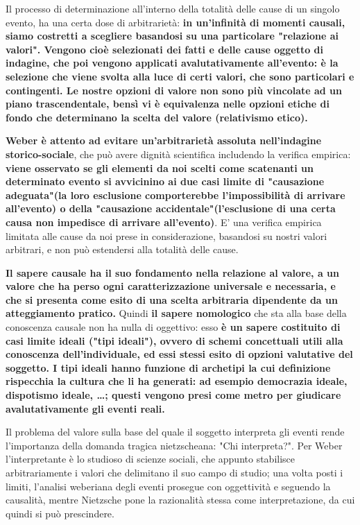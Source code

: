 Il processo di determinazione all'interno della totalità delle cause di un singolo evento, ha una certa dose di arbitrarietà: \textbf{in un'infinità di momenti causali, siamo costretti a scegliere basandosi su una particolare "relazione ai valori". Vengono cioè selezionati dei fatti e delle cause oggetto di indagine, che poi vengono applicati avalutativamente all'evento: è la selezione che viene svolta alla luce di certi valori, che sono particolari e contingenti. Le nostre opzioni di valore non sono più vincolate  ad un piano trascendentale, bensì vi è equivalenza nelle opzioni etiche di fondo che determinano la scelta del valore (relativismo etico).}

\textbf{Weber è attento ad evitare un'arbitrarietà assoluta nell'indagine storico-sociale}, che può avere dignità scientifica includendo la verifica empirica: \textbf{viene osservato se gli elementi da noi scelti come scatenanti un determinato evento si avvicinino ai due casi limite di "causazione adeguata"(la loro esclusione comporterebbe l'impossibilità di arrivare all'evento) o della "causazione accidentale"(l'esclusione di una certa causa non impedisce di arrivare all'evento)}. E' una verifica empirica limitata  alle cause da noi prese in considerazione, basandosi su nostri valori arbitrari, e non può estendersi alla totalità delle cause.

\textbf{Il sapere causale ha il suo fondamento nella relazione al valore, a un valore che ha perso ogni caratterizzazione universale e necessaria, e che si presenta come esito di una scelta arbitraria dipendente  da  un atteggiamento pratico.}
Quindi \textbf{il sapere nomologico} che sta alla base della conoscenza causale non ha nulla di oggettivo: esso \textbf{è un sapere costituito  di casi limite ideali ("tipi ideali"), ovvero di schemi concettuali utili alla conoscenza dell'individuale, ed essi stessi esito di  opzioni valutative del soggetto. I tipi ideali hanno funzione di archetipi la cui definizione rispecchia la cultura che li ha generati: ad esempio democrazia ideale, dispotismo ideale, \dots; questi vengono presi come metro per giudicare avalutativamente gli eventi reali.}
 
Il problema del valore sulla base del quale il soggetto interpreta gli eventi rende l'importanza della domanda tragica nietzscheana: "Chi interpreta?". Per Weber l'interpretante è lo studioso di scienze sociali, che appunto stabilisce arbitrariamente i valori che delimitano il suo campo di studio; una volta posti i limiti, l'analisi weberiana degli eventi prosegue con oggettività e seguendo la causalità, mentre Nietzsche pone la razionalità stessa come interpretazione, da cui quindi si può prescindere.

